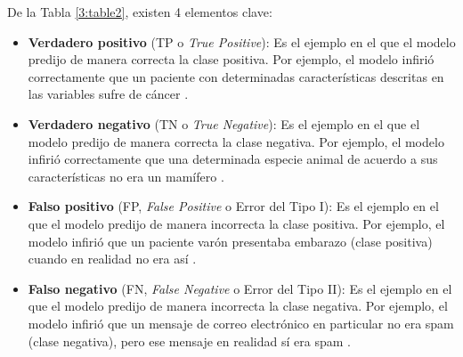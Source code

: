 De la Tabla \ref{3:table2}, existen 4 elementos clave:
\begin{itemize}
	\item \textbf{Verdadero positivo} (TP o \textit{True Positive}): Es el ejemplo en el que el modelo predijo de manera correcta la clase positiva. Por ejemplo, el modelo infirió correctamente que un paciente con determinadas características descritas en las variables sufre de cáncer \parencite{gl_google2018machinelearning}.
	\item \textbf{Verdadero negativo} (TN o \textit{True Negative}): Es el ejemplo en el que el modelo predijo de manera correcta la clase negativa. Por ejemplo, el modelo infirió correctamente que una determinada especie animal de acuerdo a sus características no era un mamífero \parencite{gl_google2018machinelearning}.
	\item \textbf{Falso positivo} (FP, \textit{False Positive} o Error del Tipo I): Es el ejemplo en el que el modelo predijo de manera incorrecta la clase positiva. Por ejemplo, el modelo infirió que un paciente varón presentaba embarazo (clase positiva) cuando en realidad no era así \parencite{gl_google2018machinelearning}.
	\item \textbf{Falso negativo} (FN, \textit{False Negative} o Error del Tipo II): Es el ejemplo en el que el modelo predijo de manera incorrecta la clase negativa. Por ejemplo, el modelo infirió que un mensaje de correo electrónico en particular no era spam (clase negativa), pero ese mensaje en realidad sí era spam \parencite{gl_google2018machinelearning}. 
\end{itemize}

